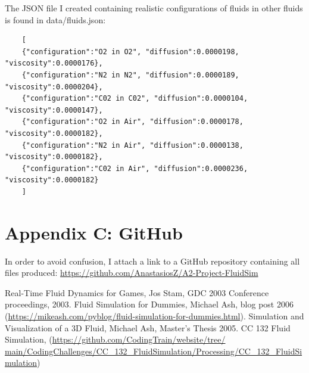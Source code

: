 \documentclass[12pt,a4paper]{book}
\begin{document}
The JSON file I created containing realistic configurations of fluids in other fluids is found in data/fluids.json:
\begin{verbatim}
	[
	{"configuration":"O2 in O2", "diffusion":0.0000198, "viscosity":0.0000176},
	{"configuration":"N2 in N2", "diffusion":0.0000189, "viscosity":0.0000204},
	{"configuration":"C02 in C02", "diffusion":0.0000104, "viscosity":0.0000147},
	{"configuration":"O2 in Air", "diffusion":0.0000178, "viscosity":0.0000182},
	{"configuration":"N2 in Air", "diffusion":0.0000138, "viscosity":0.0000182},
	{"configuration":"C02 in Air", "diffusion":0.0000236, "viscosity":0.0000182}    
	]
\end{verbatim}


\section{Appendix C: GitHub}
In order to avoid confusion, I attach a link to a GitHub repository containing all files produced: \href{https://github.com/AnastasiosZ/A2-Project-FluidSim}{https://github.com/AnastasiosZ/A2-Project-FluidSim}


\begin{thebibliography}{9}
	 Real-Time Fluid Dynamics for Games, Jos Stam, GDC 2003 Conference proceedings, 2003.
	 Fluid Simulation for Dummies, Michael Ash, blog post 2006 (\href{https://mikeash.com/pyblog/fluid-simulation-for-dummies.html}{https://mikeash.com/pyblog/fluid-simulation-for-dummies.html}).
	 Simulation and Visualization of a 3D Fluid, Michael Ash, Master's Thesis 2005.
	 CC 132 Fluid Simulation, (\href{https://github.com/CodingTrain/website/tree/main/CodingChallenges/CC_132_FluidSimulation/Processing/CC_132_FluidSimulation}{https://github.com/CodingTrain/website/tree/\\main/CodingChallenges/CC\_132\_FluidSimulation/Processing/CC\_132\_FluidSimulation})
\end{thebibliography}
\end{document}
